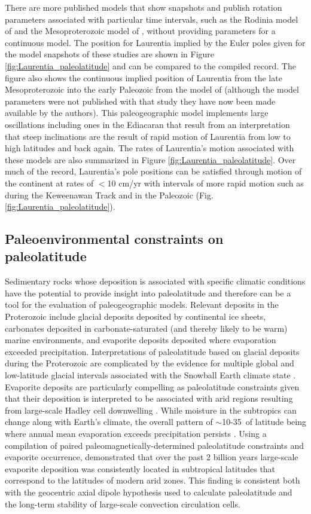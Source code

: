 \documentclass[twocolumn, switch]{article} %
\begin{document}
There are more published models that show snapshots and publish rotation parameters associated with particular time intervals, such as the Rodinia model of \cite{Li2008a} and the Mesoproterozoic model of \cite{Pisarevsky2014b}, without providing parameters for a continuous model. The position for Laurentia implied by the Euler poles given for the model snapshots of these studies are shown in Figure \ref{fig:Laurentia_paleolatitude} and can be compared to the compiled record. The figure also shows the continuous implied position of Laurentia from the late Mesoproterozoic into the early Paleozoic from the model of \citet{Li2013a} (although the model parameters were not published with that study they have now been made available by the authors). This paleogeographic model implements large oscillations including ones in the Ediacaran that result from an interpretation that steep inclinations are the result of rapid motion of Laurentia from low to high latitudes and back again. The rates of Laurentia's motion associated with these models are also summarized in Figure \ref{fig:Laurentia_paleolatitude}. Over much of the record, Laurentia's pole positions can be satisfied through motion of the continent at rates of $<$10 cm/yr with intervals of more rapid motion such as during the Keweenawan Track and in the Paleozoic (Fig. \ref{fig:Laurentia_paleolatitude}).

\subsection{Paleoenvironmental constraints on paleolatitude}

Sedimentary rocks whose deposition is associated with specific climatic conditions have the potential to provide insight into paleolatitude and therefore can be a tool for the evaluation of paleogeographic models. Relevant deposits in the Proterozoic include glacial deposits deposited by continental ice sheets, carbonates deposited in carbonate-saturated (and thereby likely to be warm) marine environments, and evaporite deposits deposited where evaporation exceeded precipitation. Interpretations of paleolatitude based on glacial deposits during the Proterozoic are complicated by the evidence for multiple global and low-latitude glacial intervals associated with the Snowball Earth climate state \citep{Evans2003b}. Evaporite deposits are particularly compelling as paleolatitude constraints given that their deposition is interpreted to be associated with arid regions resulting from large-scale Hadley cell downwelling \citep{Evans2006a}. While moisture in the subtropics can change along with Earth's climate, the overall pattern of $\sim$10-35\textdegree\ of latitude being where annual mean evaporation exceeds precipitation persists \citep{Burls2017a}. Using a compilation of paired paleomagnetically-determined paleolatitude constraints and evaporite occurrence, \cite{Evans2006a} demonstrated that over the past 2 billion years large-scale evaporite deposition was consistently located in subtropical latitudes that correspond to the latitudes of modern arid zones. This finding is consistent both with the geocentric axial dipole hypothesis used to calculate paleolatitude and the long-term stability of large-scale convection circulation cells. 
\end{document}
